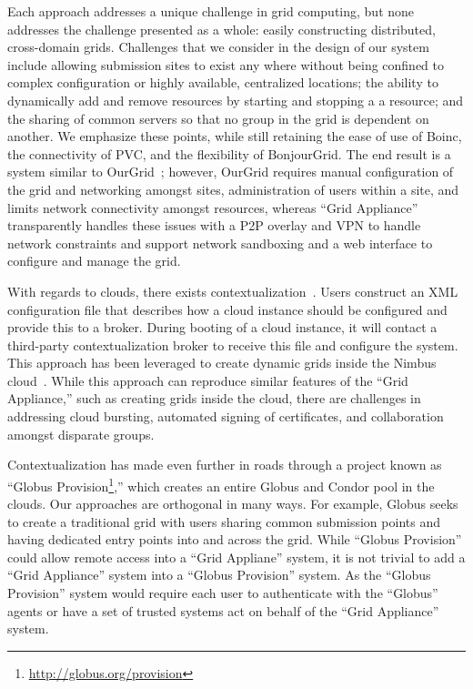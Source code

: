 \documentclass[twocolumn]{svjour3}
\begin{document}
Each approach addresses a unique challenge in grid computing, but none
addresses the challenge presented as a whole: easily constructing distributed,
cross-domain grids.  Challenges that we consider in the design of our system
include allowing submission sites to exist any where without being confined to
complex configuration or highly available, centralized locations; the ability
to dynamically add and remove resources by starting and stopping a a resource;
and the sharing of common servers so that no group in the grid is dependent on
another.  We emphasize these points, while still retaining the ease of use of
Boinc, the connectivity of PVC, and the flexibility of BonjourGrid.  The end
result is a system similar to OurGrid~\cite{ourgrid}; however, OurGrid requires
manual configuration of the grid and networking amongst sites, administration
of users within a site, and limits network connectivity amongst resources,
whereas ``Grid Appliance'' transparently handles these issues with a P2P
overlay and VPN to handle network constraints and support network sandboxing
and a web interface to configure and manage the grid.

With regards to clouds, there exists contextualization~\cite{context}.  Users
construct an XML configuration file that describes how a cloud instance should
be configured and provide this to a broker.  During booting of a cloud
instance, it will contact a third-party contextualization broker to receive
this file and configure the system.  This approach has been leveraged to create
dynamic grids inside the Nimbus cloud~\cite{alien_grid}.  While this approach
can reproduce similar features of the ``Grid Appliance,'' such as creating
grids inside the cloud, there are challenges in addressing cloud bursting,
automated signing of certificates, and collaboration amongst disparate groups.

Contextualization has made even further in roads through a project known as
``Globus Provision\footnote{\url{http://globus.org/provision}},'' which creates
an entire Globus and Condor pool in the clouds.  Our approaches are orthogonal
in many ways.  For example, Globus seeks to create a traditional grid with
users sharing common submission points and having dedicated entry points into
and across the grid.   While ``Globus Provision'' could allow remote access
into a ``Grid Appliane'' system, it is not trivial to add a ``Grid Appliance''
system into a ``Globus Provision'' system.  As the ``Globus Provision'' system
would require each user to authenticate with the ``Globus'' agents or have a
set of trusted systems act on behalf of the ``Grid Appliance'' system.
\end{document}
